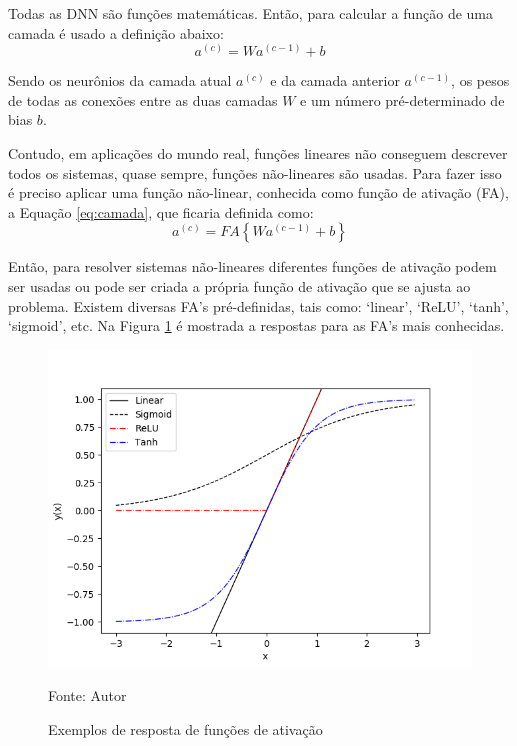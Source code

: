Todas as DNN são funções matemáticas. 
Então, para calcular a função de uma camada é usado a definição abaixo:
\begin{equation}
    a^{(c)} = W a^{(c-1)} + b
    \label{eq:camada}
\end{equation}

Sendo os neurônios da camada atual $a^{(c)}$ e da camada anterior $a^{(c-1)}$, os pesos de todas as conexões entre as duas camadas $W$ e um número pré-determinado de bias $b$.

Contudo, em aplicações do mundo real, funções lineares não conseguem descrever todos os sistemas, quase sempre, funções não-lineares são usadas. Para fazer isso é preciso aplicar uma função não-linear, conhecida como função de ativação (FA), a Equação \ref{eq:camada}, que ficaria definida como:
\begin{equation}
    a^{(c)} = FA\left\{W a^{(c-1)} + b\right\}
\end{equation}

Então, para resolver sistemas não-lineares diferentes funções de ativação podem ser usadas ou pode ser criada a própria função de ativação que se ajusta ao problema. Existem diversas FA's pré-definidas, tais como: `linear', `ReLU', `tanh', `sigmoid', etc.
Na Figura \ref{fig:FA} é mostrada a respostas para as FA's mais conhecidas.

\begin{figure}[H]
\caption{Exemplos de resposta de funções de ativação}
\centerline{\includegraphics[width=\columnwidth]{imagens/function_activation.png}}
\small{Fonte: Autor}
\label{fig:FA}
\end{figure}

